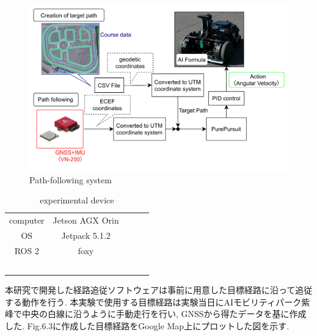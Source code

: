 \begin{figure}[H]
  \centering
 \includegraphics[keepaspectratio, scale=0.2]
      {images/system.png}
 \caption{Path-following system}
 \label{fig:Path-following system}
\end{figure}

\begin{table}[H]
     \centering
     \caption{experimental device}
     \begin{tabular}{cclll}
     \cline{1-2}
     computer             & Jetson AGX Orin &  &  &  \\
     OS                   & Jetpack 5.1.2   &  &  &  \\
     ROS 2                & foxy            &  &  &  \\
                          &                 &  &  &  \\
                          &                 &  &  &  \\
                          &                 &  &  &  \\
     \multicolumn{1}{l}{} &                 &  &  &  \\
     \multicolumn{1}{l}{} &                 &  &  & 
     \end{tabular}
\end{table}

本研究で開発した経路追従ソフトウェアは事前に用意した目標経路に沿って追従する動作を行う.
本実験で使用する目標経路は実験当日にAIモビリティパーク紫峰で中央の白線に沿うように手動走行を行い, GNSSから得たデータを基に作成した.
Fig.6.3に作成した目標経路をGoogle Map上にプロットした図を示す.

